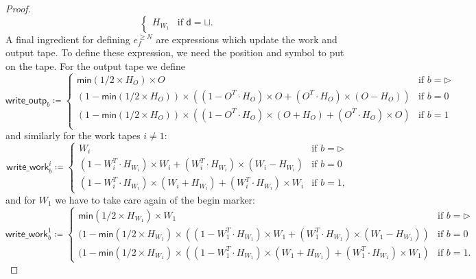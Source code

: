 \begin{proof}
$$\begin{cases}
	H_{W_1} & \text{if $\mathsf{d}=\sqcup$}. 	
\end{cases}
$$
A final ingredient for defining $e_f^{\geq N}$ are expressions which update the work and output tape.
To define these expression, we need the position and symbol to put on the tape. For the output tape we define
$$
\mathsf{write\_outp}_b\coloneqq \begin{cases}
\mathsf{min}(1/2\times H_O)\times O & \text{if $b=\rhd$}\\
(1-\mathsf{min}(1/2\times H_O))\times\left((1-O^T\cdot H_O)\times O + (O^T\cdot H_O)\times (O-H_O)\right) &\text{if $b=0$}\\
(1-\mathsf{min}(1/2\times H_O))\times\left((1-O^T\cdot H_O)\times (O+H_O) + (O^T\cdot H_O)\times O\right) &\text{if $b=1$}\\
\end{cases}
$$
and similarly for the work tapes $i\neq 1$:
$$
\mathsf{write\_work}_b^i\coloneqq \begin{cases}
W_i & \text{if $b=\rhd$}\\
(1-W_i^T\cdot H_{W_i})\times W_i + (W_i^T\cdot H_{W_i})\times (W_i-H_{W_i}) &\text{if $b=0$}\\
(1-W_i^T\cdot H_{W_i})\times (W_i+H_{W_i}) + (W_i^T\cdot H_{W_i})\times W_i &\text{if $b=1$},
\end{cases}
$$
and for  $W_1$ we have to take care again of the begin marker:
$$
\mathsf{write\_work}_b^1\coloneqq \begin{cases}
\mathsf{min}(1/2\times H_{W_1})\times W_1 & \text{if $b=\rhd$}\\
(1-\mathsf{min}(1/2\times H_{W_1})\times\left((1-W_1^T\cdot H_{W_1})\times W_1 + (W_1^T\cdot H_{W_1})\times (W_1-H_{W_1})\right) &\text{if $b=0$}\\
(1-\mathsf{min}(1/2\times H_{W_1})\times\left((1-W_1^T\cdot H_{W_1})\times (W_1+H_{W_1}) + (W_1^T\cdot H_{W_1})\times W_1\right) &\text{if $b=1$}.
\end{cases}
$$





\end{proof}
